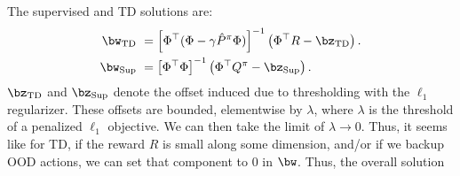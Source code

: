 The supervised and TD solutions are:
\begin{align}
    \bw_{\mathrm{TD}} ~&= \left[\Phi^\top (\Phi - \gamma \hat{P}^\pi \Phi)\right]^{-1} \left( \Phi^\top R - \bz_\mathrm{TD} \right).\\
    \bw_{\mathrm{Sup}} ~&= \left[\Phi^\top \Phi\right]^{-1} \left(\Phi^\top Q^\pi - \bz_{\mathrm{Sup}}\right).
\end{align}
$\bz_\mathrm{TD}$ and $\bz_{\mathrm{Sup}}$ denote the offset induced due to thresholding with the $\ell_1$ regularizer. These offsets are bounded, elementwise by $\lambda$, where $\lambda$ is the threshold of a penalized $\ell_1$ objective. We can then take the limit of $\lambda \rightarrow 0$. Thus, it seems like for TD, if the reward $R$ is small along some dimension, and/or if we backup OOD actions, we can set that component to $0$ in $\bw$. Thus, the overall solution    

